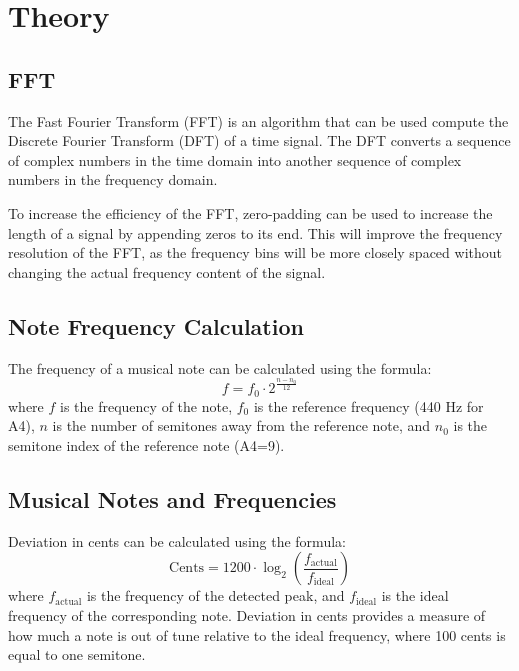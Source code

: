 \chapter{Theory}


\section{FFT} 

The Fast Fourier Transform (FFT) is an algorithm that can be used compute the Discrete Fourier Transform (DFT) of a time signal. The DFT converts a sequence of complex numbers in the time domain into another sequence of complex numbers in the frequency domain. 

To increase the efficiency of the FFT, zero-padding can be used to increase the length of a signal by appending zeros to its end. This will improve the frequency resolution of the FFT, as the frequency bins will be more closely spaced without changing the actual frequency content of the signal. 


\section{Note Frequency Calculation}

The frequency of a musical note can be calculated using the formula:
\begin{equation}
f = f_0 \cdot 2^{\frac{n - n_0}{12}}
\label{eq:note_freq}
\end{equation}
where \( f \) is the frequency of the note, \( f_0 \) is the reference frequency (440 Hz for A4), \( n \) is the number of semitones away from the reference note, and \( n_0 \) is the semitone index of the reference note (A4=9).


\section{Musical Notes and Frequencies}

Deviation in cents can be calculated using the formula:
\begin{equation}
\text{Cents} = 1200 \cdot \log_2\left(\frac{f_{\text{actual}}}{f_{\text{ideal}}}\right)
\label{eq:deviation_cents}
\end{equation}
where \( f_{\text{actual}} \) is the frequency of the detected peak, and \( f_{\text{ideal}} \) is the ideal frequency of the corresponding note. Deviation in cents provides a measure of how much a note is out of tune relative to the ideal frequency, where 100 cents is equal to one semitone.
